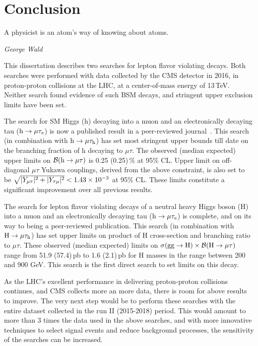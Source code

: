 %
%

\chapter{Conclusion}
\epigraph{A physicist is an atom's way of knowing about atoms.}{\textit{George Wald}}
\vskip 0.6in
\label{conclusion}

This dissertation describes two searches for lepton flavor violating decays. Both searches were performed with data collected by the CMS detector in 2016, in proton-proton collisions at the LHC, at a center-of-mass energy of 13\,TeV. Neither search found evidence of such BSM decays, and stringent upper exclusion limits have been set.

The search for SM Higgs (h) decaying into a muon and an electronically decaying tau ($\text{h} \to \mu \tau_{e}$) is now a published result in a peer-reviewed journal~\cite{HIG-17-001}. This search (in combination with $\text{h} \to \mu \tau_{\text{h}}$) has set most stringent upper bounds till date on the branching fraction of h decaying to $\mu\tau$. The observed (median expected) upper limits on $\mathcal{B}(\text{h} \to \mu \tau)$ is 0.25 (0.25)\,\% at 95\% CL. Upper limit on off-diagonal $\mu\tau$ Yukawa couplings, derived from the above constraint, is also set to be $\sqrt{|Y_{\mu\tau}|^{2}+|Y_{\tau\mu}|^{2}}<1.43\times 10^{-3}$ at 95\% CL. These limits constitute a significant improvement over all previous results.

The search for lepton flavor violating decays of a neutral heavy Higgs boson (H) into a muon and an electronically decaying tau ($\text{h} \to \mu \tau_{e}$) is complete, and on its way to being a peer-reviewed publication. This search (in combination with $\text{H} \to \mu \tau_{\text{h}}$) has set upper limits on product of H cross-section and branching ratio to $\mu\tau$. These observed (median expected) limits on $\sigma(\textrm{gg}\rightarrow \text{H})\times\mathcal{B}(\text{H} \to \mu \tau)$ range from 51.9 (57.4)\,pb to 1.6 (2.1)\,pb for H masses in the range between 200 and 900 GeV. This search is the first direct search to set limits on this decay.

As the LHC's excellent performance in delivering proton-proton collisions continues, and CMS collects more an more  data, there is room for above results to improve. The very next step would be to perform these searches with the entire dataset collected in the run II (2015-2018) period. This would amount to more than 3 times the data used in the above searches, and with more innovative techniques to select signal events and reduce background processes, the sensitivity of the searches can be increased. 






